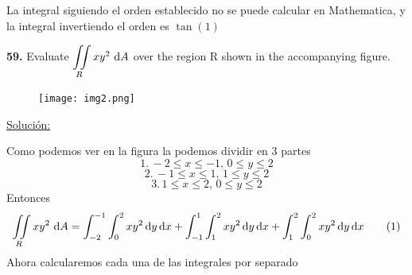 \documentclass[11pt]{report}
\newcommand{\s}{\underline{Soluci\'{o}n:}}
\begin{document}
La integral siguiendo el orden establecido no se puede calcular en Mathematica,
y la integral invertiendo el orden es $\tan(1)$

\textbf{59.} Evaluate $ {\displaystyle \iint \limits_R } \, xy^2 \, \, \text dA $ over
the region R shown in the accompanying figure. \\
\begin{figure}[h]
\texttt{[image: img2.png]}
\centering
\end{figure}

\s

Como podemos ver en la figura la podemos dividir en 3 partes
\[1.\, -2 \leq x \leq -1, \, 0 \leq y \leq 2\]
\[2.\, -1 \leq x \leq 1, \, 1 \leq y \leq 2\]
\[3.\, 1 \leq x \leq 2, \, 0 \leq y \leq 2 \]
Entonces
\[{\displaystyle \iint \limits_R } \, xy^2 \, \, \text dA =
\int^{-1}_{-2} \int^{2}_{0} xy^2 \, \text dy \, \text dx +
\int^{1}_{-1} \int^{2}_{1} xy^2 \, \text dy  \, \text dx +
\int^{2}_{1} \int^{2}_{0} xy^2 \, \text dy \, \text dx \qquad (1)\]
Ahora calcularemos cada una de las integrales por separado
\end{document}
